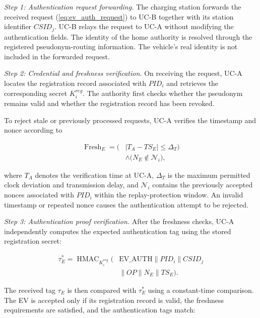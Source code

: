 \documentclass[twocolumn,10pt,journal]{IEEEtran}
\begin{document}
\textit{Step 1: Authentication request forwarding.}
The charging station forwards the received request
(\ref{eq:ev_auth_request}) to UC-B together with its
station identifier $CSID_j$. UC-B relays the request
to UC-A without modifying the authentication fields.
The identity of the home authority is resolved through
the registered pseudonym-routing information. The
vehicle's real identity is not included in the forwarded
request.

\textit{Step 2: Credential and freshness verification.}
On receiving the request, UC-A locates the registration
record associated with $PID_i$ and retrieves the
corresponding secret $K_i^{reg}$. The authority first
checks whether the pseudonym remains valid and whether
the registration record has been revoked.

To reject stale or previously processed requests,
UC-A verifies the timestamp and nonce according to

\begin{equation}
\begin{aligned}
\operatorname{Fresh}_{E}
=
\bigl(&|T_A-TS_E|\leq\Delta_T\bigr)
\\
&\land
\bigl(N_E\notin\mathcal{N}_i\bigr),
\end{aligned}
\label{eq:ev_auth_freshness}
\end{equation}

where $T_A$ denotes the verification time at UC-A,
$\Delta_T$ is the maximum permitted clock deviation
and transmission delay, and $\mathcal{N}_i$ contains
the previously accepted nonces associated with
$PID_i$ within the replay-protection window.
An invalid timestamp or repeated nonce causes
the authentication attempt to be rejected.

\textit{Step 3: Authentication proof verification.}
After the freshness checks, UC-A independently
computes the expected authentication tag using
the stored registration secret:

\begin{equation}
\begin{aligned}
\tau_E^{*}
=
\operatorname{HMAC}_{K_i^{reg}}\big(
&\mathrm{EV\_AUTH}\parallel PID_i
\parallel CSID_j\\
&\parallel OP\parallel N_E
\parallel TS_E\big).
\end{aligned}
\label{eq:ev_auth_recomputed}
\end{equation}

The received tag $\tau_E$ is then compared with
$\tau_E^{*}$ using a constant-time comparison.
The EV is accepted only if its registration record
is valid, the freshness requirements are satisfied,
and the authentication tags match:
\end{document}
